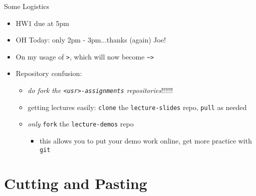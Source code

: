 \begin{frame}{Some Logistics}
  \begin{itemize}[<+- | alert@+>]
    \item HW1 due  at 5pm
    \item OH Today: only 2pm - 3pm...thanks (again) Joe!
    \item On my usage of \texttt{>}, which will now become \texttt{\textasciitilde>}
    \item Repository confusion:
    \begin{itemize}[<+- | alert@+>]
      \item \emph{do  fork the \texttt{<usr>-assignments} repositories}!!!!!!
      \item getting lectures easily: \texttt{clone} the \texttt{lecture-slides} repo, \texttt{pull} as needed
      \item \emph{only} \texttt{fork} the \texttt{lecture-demos} repo
      \begin{itemize}[<+- | alert@+>]
        \item this allows you to put your demo work online, get more practice with \texttt{git}
      \end{itemize}
    \end{itemize}
  \end{itemize}
\end{frame}

%
\section{Cutting and Pasting}
\label{sec:cutting_and_pasting}

